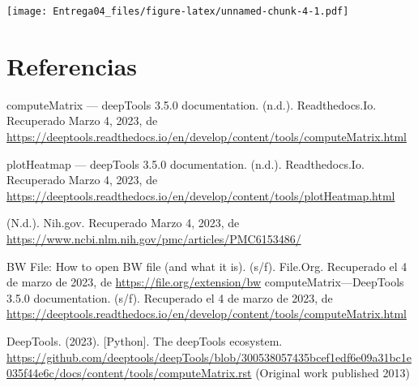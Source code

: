 \documentclass[
]{article}
\begin{document}
\texttt{[image: Entrega04\_files/figure-latex/unnamed-chunk-4-1.pdf]}

\hypertarget{referencias}{%
\section{Referencias}\label{referencias}}

computeMatrix --- deepTools 3.5.0 documentation. (n.d.). Readthedocs.Io.
Recuperado Marzo 4, 2023, de
\url{https://deeptools.readthedocs.io/en/develop/content/tools/computeMatrix.html}

plotHeatmap --- deepTools 3.5.0 documentation. (n.d.). Readthedocs.Io.
Recuperado Marzo 4, 2023, de
\url{https://deeptools.readthedocs.io/en/develop/content/tools/plotHeatmap.html}

(N.d.). Nih.gov. Recuperado Marzo 4, 2023, de
\url{https://www.ncbi.nlm.nih.gov/pmc/articles/PMC6153486/}

BW File: How to open BW file (and what it is). (s/f). File.Org.
Recuperado el 4 de marzo de 2023, de \url{https://file.org/extension/bw}
computeMatrix---DeepTools 3.5.0 documentation. (s/f). Recuperado el 4 de
marzo de 2023, de
\url{https://deeptools.readthedocs.io/en/develop/content/tools/computeMatrix.html}

DeepTools. (2023). {[}Python{]}. The deepTools ecosystem.
\url{https://github.com/deeptools/deepTools/blob/300538057435bcef1edf6e09a31bc1e035f44e6c/docs/content/tools/computeMatrix.rst}
(Original work published 2013)
\end{document}
